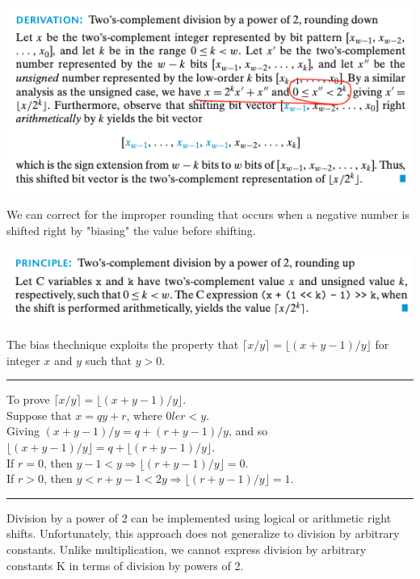 \documentclass[11pt]{article}
\begin{document}
\begin{center}
\includegraphics[width=.9\linewidth]{pics/derivation-two's-complement-division-by-a-power-of-2-rounding-down.png}
\end{center}

We can correct for the improper rounding that occurs when a negative number is shifted right by "biasing" the value before shifting.\\


\begin{center}
\includegraphics[width=.9\linewidth]{pics/two's-complement-division-by-a-power-of-2-rounding-up.png}
\end{center}

The bias thechnique exploits the property that \(\lceil x/y \rceil = \lfloor (x+y-1)/y \rfloor\) for integer \(x\) and \(y\) such that \(y>0\).\\

\noindent\rule{\textwidth}{0.5pt}
To prove \(\lceil x/y \rceil = \lfloor (x+y-1)/y \rfloor\).\\
Suppose that \(x = qy + r\), where \(0 le r < y\).\\
Giving \((x+y-1)/y = q + (r+y-1)/y\), and so \(\lfloor (x+y-1)/y \rfloor = q + \lfloor (r+y-1)/y \rfloor\).\\
If \(r=0\), then \(y-1 < y \Longrightarrow \lfloor (r+y-1)/y \rfloor = 0\).\\
If \(r>0\), then \(y < r+y-1<2y \Longrightarrow \lfloor (r+y-1)/y \rfloor =1\).\\

\noindent\rule{\textwidth}{0.5pt}


Division by a power of 2 can be implemented using logical or arithmetic right shifts. Unfortunately, this approach does not generalize to division by arbitrary constants. Unlike multiplication, we cannot express division by arbitrary constants K in terms of division by powers of 2.\\
\end{document}
